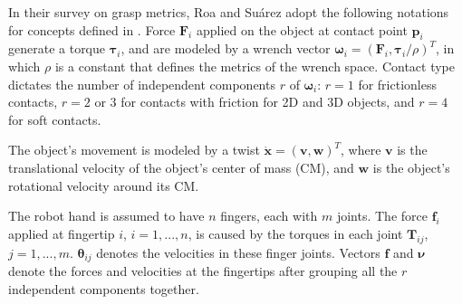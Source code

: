 In their survey on grasp metrics, Roa and Su{\'a}rez \cite{Roa2015} adopt the following notations for concepts defined
in \cite{Murray1994}. Force $ \boldsymbol{F}_i $ applied on the object at contact point $ \boldsymbol{p}_i $ generate a
torque $ \boldsymbol{\tau}_i $, and are modeled by a wrench vector
$ \boldsymbol{\omega}_i = (\boldsymbol{F}_i, \boldsymbol{\tau}_i/\rho)^T $, in which $ \rho $ is a constant that defines
the metrics of the wrench space. Contact type dictates the number of independent components $ r $ of
$ \boldsymbol{\omega}_i $: $ r=1 $ for frictionless contacts, $ r = 2 $ or $ 3 $ for contacts with friction for 2D and 3D
objects, and $ r = 4 $ for soft contacts.

The object's movement is modeled by a twist $ \boldsymbol{\dot{x}} = (\boldsymbol{v}, \boldsymbol{w})^T $, where
$ \boldsymbol{v} $ is the translational velocity of the object's center of mass (CM), and $ \boldsymbol{w} $ is the
object's rotational velocity around its CM.

The robot hand is assumed to have $ n $ fingers, each with $ m $ joints. The force $ \boldsymbol{f}_i $ applied at
fingertip $ i $, $ i = 1,...,n $, is caused by the torques in each joint $ \boldsymbol{T}_{ij} $, $ j = 1,...,m$.
$ \boldsymbol{\theta}_{ij} $ denotes the velocities in these finger joints. Vectors $ \boldsymbol{f} $ and
$ \boldsymbol{\nu} $ denote the forces and velocities at the fingertips after grouping all the $ r $ independent
components together.

